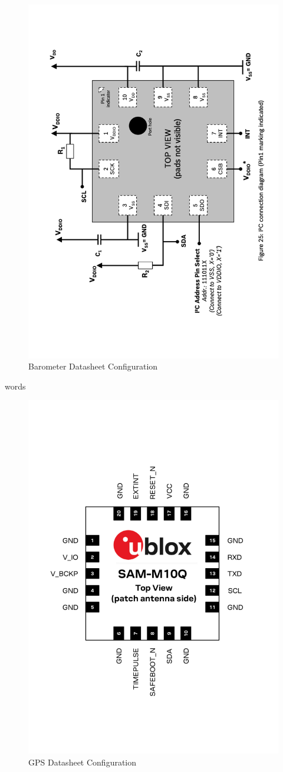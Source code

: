 \documentclass{report}
\begin{document}
                \begin{figure}[H]
                    \centering
                    \includegraphics[width=0.4\linewidth, angle=270]{figures/BARO_DS.pdf}
                    \caption{Barometer Datasheet Configuration}
                    \label{fig:baro_ds}
                \end{figure}

                words
                \begin{figure}[H]
                    \centering
                    \includegraphics[width=0.4\linewidth]{figures/GPS_DS.pdf}
                    \caption{GPS Datasheet Configuration}
                    \label{fig:gps_ds}
                \end{figure}
\end{document}
